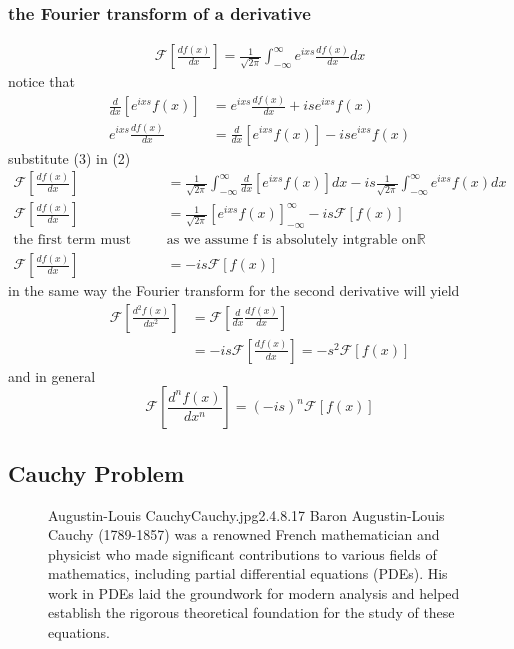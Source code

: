\documentclass[]{article}
\begin{document}
\subsubsection*{the Fourier transform of a derivative}
\begin{align}
    \mathscr{F}\left[\frac{df\left(x\right)}{dx}\right]=\frac{1}{\sqrt{2\pi}}\int_{-\infty}^{\infty}e^{ixs}\frac{df\left(x\right)}{dx}dx
\end{align}
notice that
\begin{align}
\frac{d}{dx}\left[e^{ixs}f\left(x\right)\right] &= e^{ixs}\frac{df\left(x\right)}{dx} + ise^{ixs}f\left(x\right)
\\
e^{ixs}\frac{df\left(x\right)}{dx} &= \frac{d}{dx}\left[e^{ixs}f\left(x\right)\right] -ise^{ixs}f\left(x\right)
\end{align}
substitute (3) in (2)
\begin{align*}
\mathscr{F}\left[\frac{df\left(x\right)}{dx}\right] &= \frac{1}{\sqrt{2\pi}}
\int_{-\infty}^{\infty}\frac{d}{dx}\left[e^{ixs}f\left(x\right)\right]dx - is\frac{1}{\sqrt{2\pi}}\int_{-\infty}^{\infty}e^{ixs}f\left(x\right)dx
\\
\mathscr{F}\left[\frac{df\left(x\right)}{dx}\right] &= \frac{1}{\sqrt{2\pi}}{\left[e^{ixs}f\left(x\right)\right]}_{-\infty}^{\infty} - is \mathscr{F}\left[f\left(x\right)\right]
\\
\text{the  first term must vanish }&\text{as we assume f is absolutely intgrable on} \mathbb{R}
\\
\mathscr{F}\left[\frac{df\left(x\right)}{dx}\right] &= - is \mathscr{F}\left[f\left(x\right)\right]
\end{align*}
in the same way the Fourier transform for the second derivative will yield
\begin{align*}
\mathscr{F}\left[\frac{d^2f\left(x\right)}{dx^2}\right] &=  \mathscr{F}\left[\frac{d}{dx}\frac{df\left(x\right)}{dx}\right]
\\
&= - is\mathscr{F}\left[\frac{df\left(x\right)}{dx}\right] = -s^2 \mathscr{F}\left[f\left(x\right)\right]
\end{align*}
and in general
\[
    \mathscr{F}\left[\frac{d^nf\left(x\right)}{dx^n}\right] = {(-is)}^n\mathscr{F}\left[f\left(x\right)\right]    
\]
\setcounter{equation}{0}
\subsection{Cauchy Problem}
\begin{figure}[b]
    \begin{enrichment}{Augustin-Louis Cauchy}{Cauchy.jpg}{2.4}{.8}{.17}
        Baron Augustin-Louis Cauchy (1789-1857) was a renowned French mathematician and physicist who made significant contributions to various fields of mathematics, including partial differential equations (PDEs). His work in PDEs laid the groundwork for modern analysis and helped establish the rigorous theoretical foundation for the study of these equations.
    \end{enrichment}    
\end{figure}
\end{document}
